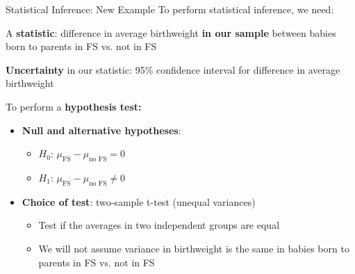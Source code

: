 \documentclass[10pt,t]{beamer}
\begin{document}
\begin{frame}{Statistical Inference: New Example}
To perform statistical inference, we need:

\vspace{0.3cm}

A \textbf{statistic}: difference in average birthweight \textbf{in our sample} between babies born to parents in FS vs. not in FS 

\vspace{0.3cm}

\textbf{Uncertainty} in our statistic: 95\% confidence interval for difference in average birthweight

\vspace{0.3cm}

To perform a \textbf{hypothesis test:}
\smallskip
\begin{itemize}
	\item \textbf{Null and alternative hypotheses}:
	\begin{itemize}
		\item $H_0$: $\mu_{\text{FS}} - \mu_{\text{no FS}} = 0$
		\item $H_1$: $\mu_{\text{FS}} - \mu_{\text{no FS}} \neq 0$
	\end{itemize}
\smallskip
	\item \textbf{Choice of test}: two-sample t-test (unequal variances)
	\begin{itemize}
		\item Test if the averages in two independent groups are equal
		\item We will not assume variance in birthweight is the same in babies born to parents in FS vs. not in FS
	\end{itemize}
\end{itemize}


\end{frame}
\end{document}
